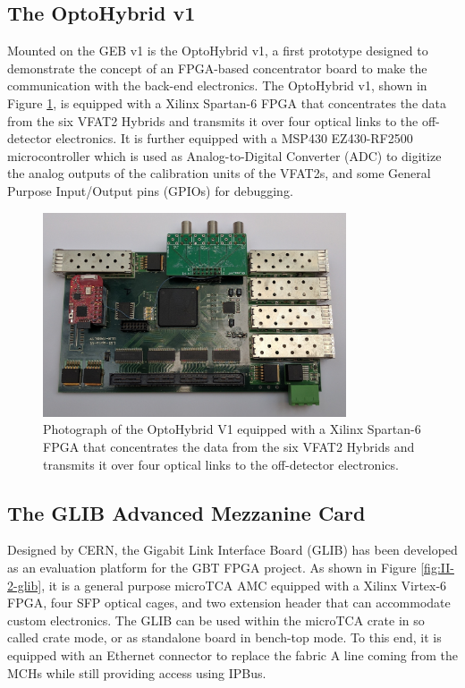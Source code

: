     \subsection{The OptoHybrid v1}

      Mounted on the GEB v1 is the OptoHybrid v1, a first prototype designed to demonstrate the concept of an FPGA-based concentrator board to make the communication with the back-end electronics. The OptoHybrid v1, shown in Figure \ref{fig:II-2-ohv1}, is equipped with a Xilinx Spartan-6 FPGA that concentrates the data from the six VFAT2 Hybrids and transmits it over four optical links to the off-detector electronics. It is further equipped with a MSP430 EZ430-RF2500 \cite{MSP430} microcontroller which is used as Analog-to-Digital Converter (ADC) to digitize the analog outputs of the calibration units of the VFAT2s, and some General Purpose Input/Output pins (GPIOs) for debugging.

      \begin{figure}[h!]
        \centering
        \includegraphics[width=0.8\textwidth]{img/II-2-daq/oh-v1.jpg}
        \caption{Photograph of the OptoHybrid V1 equipped with a Xilinx Spartan-6 FPGA that concentrates the data from the six VFAT2 Hybrids and transmits it over four optical links to the off-detector electronics.}
        \label{fig:II-2-ohv1}
      \end{figure}

    \subsection{The GLIB Advanced Mezzanine Card}

      Designed by CERN, the Gigabit Link Interface Board (GLIB) \cite{Vichoudis:1359270} has been developed as an evaluation platform for the GBT FPGA project. As shown in Figure \ref{fig:II-2-glib}, it is a general purpose microTCA AMC equipped with a Xilinx Virtex-6 FPGA, four SFP optical cages, and two extension header that can accommodate custom electronics. The GLIB can be used within the microTCA crate in so called crate mode, or as standalone board in bench-top mode. To this end, it is equipped with an Ethernet connector to replace the fabric A line coming from the MCHs while still providing access using IPBus. \\

